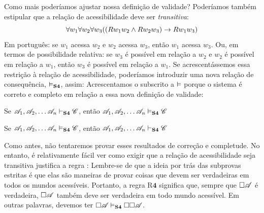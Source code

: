 Como mais poderíamos ajustar nossa definição de validade? Poderíamos também estipular que a relação de acessibilidade deve ser \emph{transitiva}:
\[\forall w_1\forall w_2\forall w_3 ((Rw_1w_2 \wedge Rw_2w_3)\rightarrow Rw_1w_3)\]
Em português: se $w_1$ acessa $w_2$ e $w_2$ acessa $w_3$, então $w_1$ acessa $w_3$. Ou, em termos de possibilidade relativa: se $w_3$ é possível em relação a $w_2$ e $w_2$ é possível em relação a $w_1$, então $w_3$ é possível em relação a $w_1$. Se acrescentássemos essa restrição à relação de acessibilidade, poderíamos introduzir uma nova relação de consequência, $\vDash_{\mathbf{S4}}$, assim:
Acrescentamos o subscrito \mlSfour{} a $\vDash$ porque o sistema \mlSfour{} é correto e completo em relação a essa nova definição de validade:
\begin{compactlist}
\item Se $\mathscr{A}_1,\mathscr{A}_2, \dots \mathscr{A}_n\vdash_{\mathbf{S4}}\mathscr{C}$, então $\mathscr{A}_1,\mathscr{A}_2, \dots \mathscr{A}_n\vDash_{\mathbf{S4}}\mathscr{C}$
\item Se $\mathscr{A}_1,\mathscr{A}_2, \dots \mathscr{A}_n\vDash_{\mathbf{S4}}\mathscr{C}$, então $\mathscr{A}_1,\mathscr{A}_2, \dots \mathscr{A}_n\vdash_{\mathbf{S4}}\mathscr{C}$
\end{compactlist}
Como antes, não tentaremos provar esses resultados de correção e completude. No entanto, é relativamente fácil ver como exigir que a relação de acessibilidade seja transitiva justifica a regra \mlSfour{}:
Lembre-se de que a ideia por trás das subprovas estritas é que elas são maneiras de provar coisas que devem ser verdadeiras em todos os mundos acessíveis. Portanto, a regra R$\mathbf{4}$ significa que, sempre que $\Box \mathscr{A}$ é verdadeira, $\Box \mathscr{A}$ também deve ser verdadeira em todo mundo acessível. Em outras palavras, devemos ter $\Box\mathscr{A} \vDash_{\mathbf{S4}} \Box\Box\mathscr{A}$.

